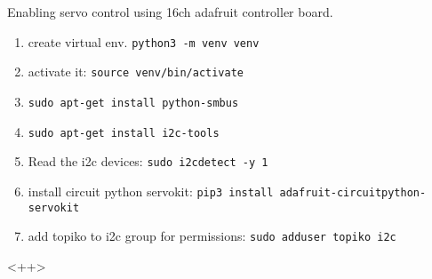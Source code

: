 \documentclass[a4paper,11pt]{article}
\begin{document}
Enabling servo control using 16ch adafruit controller board.
\begin{enumerate}
	\item create virtual env. \texttt{python3 -m venv venv}
	\item activate it: \texttt{source venv/bin/activate}
	\item  \texttt{sudo apt-get install python-smbus}
	\item \texttt{sudo apt-get install i2c-tools}
	\item Read the i2c devices: \texttt{sudo i2cdetect -y 1}
	\item install circuit python servokit: \texttt{pip3 install adafruit-circuitpython-servokit}
	\item add topiko to i2c group for permissions: \texttt{sudo adduser topiko i2c}
\end{enumerate}<++>
%
%
\end{document}

